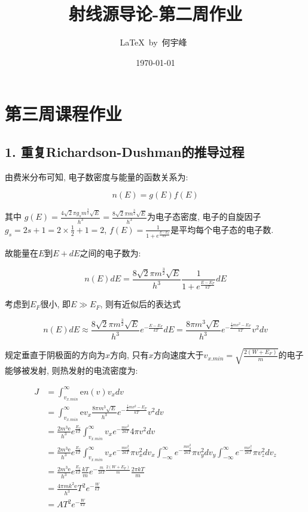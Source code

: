 \documentclass{article}
\title{射线源导论-第二周作业}
\author{\LaTeX\ by\ 何宇峰\ }
\date{\today}
\begin{document}
\pagestyle{fancy}

\fancyhead[R]{\today}

\section*{第三周课程作业}

\subsection*{1. 重复Richardson-Dushman的推导过程}

由费米分布可知, 电子数密度与能量的函数关系为:

$$n(E) = g(E) f(E)$$

其中 $g(E) = \frac{4\sqrt{2}\pi g_s m^{\frac{3}{2}}\sqrt{E}}{h^3} = \frac{8\sqrt{2}\pi m^{\frac{3}{2}}\sqrt{E}}{h^3}$为电子态密度, 电子的自旋因子$g_s = 2s + 1 = 2 \times \frac{1}{2} + 1 = 2$, $f(E)=\frac{1}{1+e^{\frac{E-E_F}{kT}}}$是平均每个电子态的电子数.

故能量在$E$到$E+dE$之间的电子数为:

$$n(E)dE = \frac{8\sqrt{2}\pi m^{\frac{3}{2}}\sqrt{E}}{h^3} \frac{1}{1+e^{\frac{E-E_F}{kT}}}dE$$

考虑到$E_F$很小, 即$E \gg E_F $, 则有近似后的表达式

$$n(E)dE \approx \frac{8\sqrt{2}\pi m^{\frac{3}{2}}\sqrt{E}}{h^3} e^{- \frac{E-E_F}{kT}}dE = \frac{8\pi m^{3}\sqrt{E}}{h^3} e^{- \frac{\frac{1}{2}mv^2-E_F}{kT}}v^2dv$$

规定垂直于阴极面的方向为$x$方向, 只有$x$方向速度大于$v_{x.min} = \sqrt{\frac{2(W+E_F)}{m}}$的电子能够被发射, 则热发射的电流密度为:

\begin{equation*}
    \begin{aligned}
        J &= \int_{v_{x.min}}^{\infty} \text{e} n(v) v_x dv \\
        &= \int_{v_{x.min}}^{\infty} \text{e} v_x \frac{8\pi m^{3}\sqrt{E}}{h^3} e^{- \frac{\frac{1}{2}mv^2-E_F}{kT}}v^2dv \\
        &= \frac{2m^3\text{e}}{h^3} e^{\frac{E_f}{kT}} \int_{v_{x.min}}^{\infty} v_x e^{-\frac{mv^2}{2kT}}4\pi v^2 dv\\
        &= \frac{2m^3\text{e}}{h^3} e^{\frac{E_f}{kT}} \int_{v_{x.min}}^{\infty} v_x e^{-\frac{mv_x^2}{2kT}}\pi v_x^2 dv_x \int_{-\infty}^{\infty} e^{-\frac{mv_y^2}{2kT}}\pi v_y^2 dv_y \int_{-\infty}^{\infty} e^{-\frac{mv_z^2}{2kT}}\pi v_z^2 dv_z\\
        &= \frac{2m^3\text{e}}{h^3} e^{\frac{E_f}{kT}}\frac{kT}{m}e^{-\frac{m}{2kT}\frac{2(W+E_F)}{m}}\frac{2\pi kT}{m}\\
        &= \frac{4\pi m k^2 \text{e}}{h^3} T^2 e^{-\frac{W}{kT}}\\
        &= A T^2 e^{-\frac{W}{kT}}
    \end{aligned}
\end{equation*}
\end{document}
